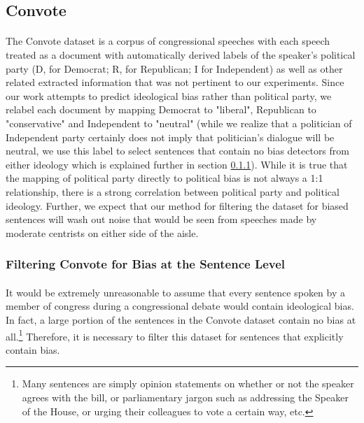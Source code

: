 \documentclass[10pt,a4paper,onecolumn]{article}
\begin{document}
\subsection{Convote}
\paragraph{}
The Convote dataset is a corpus of congressional speeches with each speech treated as a document with automatically derived labels of the speaker's political party (D, for Democrat; R, for Republican; I for Independent) as well as other related extracted information that was not pertinent to our experiments. Since our work attempts to predict ideological bias rather than political party, we relabel each document by mapping Democrat to "liberal", Republican to "conservative" and Independent to "neutral" (while we realize that a politician of Independent party certainly does not imply that politician's dialogue will be neutral, we use this label to select sentences that contain no bias detectors from either ideology which is explained further in section \ref{sec:filtering}). While it is true that the mapping of political party directly to political bias is not always a 1:1 relationship, there is a strong correlation between political party and political ideology. Further, we expect that our method for filtering the dataset for biased sentences will wash out noise that would be seen from speeches made by moderate centrists on either side of the aisle.

\subsubsection{Filtering Convote for Bias at the Sentence Level}
\label{sec:filtering}
\paragraph{}
It would be extremely unreasonable to assume that every sentence spoken by a member of congress during a congressional debate would contain ideological bias. In fact, a large portion of the sentences in the Convote dataset contain no bias at all.\footnote{Many sentences are simply opinion statements on whether or not the speaker agrees with the bill, or parliamentary jargon such as addressing the Speaker of the House, or urging their colleagues to vote a certain way, etc.} Therefore, it is necessary to filter this dataset for sentences that explicitly contain bias. 
\end{document}
